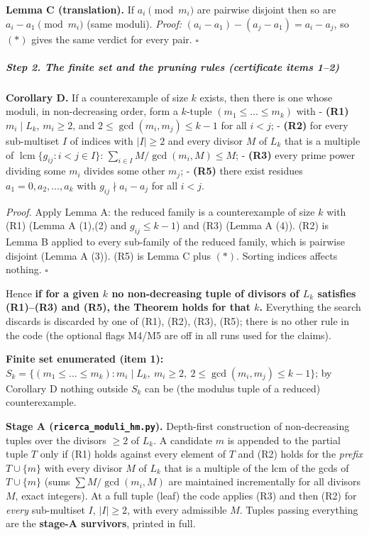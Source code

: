 \textbf{Lemma C (translation).} If \(a_i\pmod{m_i}\) are pairwise
disjoint then so are \(a_i-a_1\pmod{m_i}\) (same moduli). \emph{Proof:}
\((a_i-a_1)-(a_j-a_1)=a_i-a_j\), so \((*)\) gives the same verdict for
every pair. \(\square\)

\subparagraph{Step 2. The finite set and the pruning rules (certificate
items
1--2)}\label{step-2.-the-finite-set-and-the-pruning-rules-certificate-items-12}

\textbf{Corollary D.} If a counterexample of size \(k\) exists, then
there is one whose moduli, in non-decreasing order, form a \(k\)-tuple
\((m_1\le\dots\le m_k)\) with - \textbf{(R1)} \(m_i\mid L_k\),
\(m_i\ge2\), and \(2\le\gcd(m_i,m_j)\le k-1\) for all \(i<j\); -
\textbf{(R2)} for every sub-multiset \(I\) of indices with \(|I|\ge2\)
and every divisor \(M\) of \(L_k\) that is a multiple of
\(\operatorname{lcm}\{g_{ij}:i<j\in I\}\):
\(\sum_{i\in I} M/\gcd(m_i,M)\le M\); - \textbf{(R3)} every prime power
dividing some \(m_i\) divides some other \(m_j\); - \textbf{(R5)} there
exist residues \(a_1=0,a_2,\dots,a_k\) with \(g_{ij}\nmid a_i-a_j\) for
all \(i<j\).

\emph{Proof.} Apply Lemma A: the reduced family is a counterexample of
size \(k\) with (R1) (Lemma A (1),(2) and \(g_{ij}\le k-1\)) and (R3)
(Lemma A (4)). (R2) is Lemma B applied to every sub-family of the
reduced family, which is pairwise disjoint (Lemma A (3)). (R5) is Lemma
C plus \((*)\). Sorting indices affects nothing. \(\square\)

Hence \textbf{if for a given \(k\) no non-decreasing tuple of divisors
of \(L_k\) satisfies (R1)--(R3) and (R5), the Theorem holds for that
\(k\).} Everything the search discards is discarded by one of (R1),
(R2), (R3), (R5); there is no other rule in the code (the optional flags
M4/M5 are off in all runs used for the claims).

\textbf{Finite set enumerated (item 1):}
\(S_k=\{(m_1\le\dots\le m_k): m_i\mid L_k,\ m_i\ge2,\ 2\le\gcd(m_i,m_j)\le k-1\}\);
by Corollary D nothing outside \(S_k\) can be (the modulus tuple of a
reduced) counterexample.

\textbf{Stage A (\texttt{ricerca\_moduli\_hm.py}).} Depth-first
construction of non-decreasing tuples over the divisors \(\ge2\) of
\(L_k\). A candidate \(m\) is appended to the partial tuple \(T\) only
if (R1) holds against every element of \(T\) and (R2) holds for the
\emph{prefix} \(T\cup\{m\}\) with every divisor \(M\) of \(L_k\) that is
a multiple of the lcm of the gcds of \(T\cup\{m\}\) (sums
\(\sum M/\gcd(m_i,M)\) are maintained incrementally for all divisors
\(M\), exact integers). At a full tuple (leaf) the code applies (R3) and
then (R2) for \emph{every} sub-multiset \(I\), \(|I|\ge2\), with every
admissible \(M\). Tuples passing everything are the \textbf{stage-A
survivors}, printed in full.


